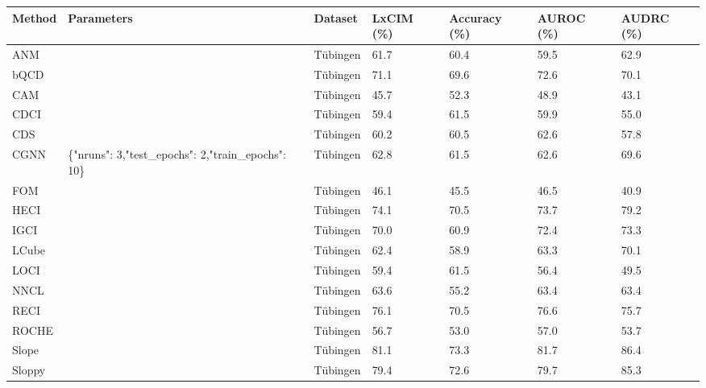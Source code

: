 \begin{tabular}{lllllll}
\toprule
Method & Parameters & Dataset & LxCIM (\%) & Accuracy (\%) & AUROC (\%) & AUDRC (\%) \\
\midrule
ANM &  & Tübingen & 61.7 & 60.4 & 59.5 & 62.9 \\
bQCD &  & Tübingen & 71.1 & 69.6 & 72.6 & 70.1 \\
CAM &  & Tübingen & 45.7 & 52.3 & 48.9 & 43.1 \\
CDCI &  & Tübingen & 59.4 & 61.5 & 59.9 & 55.0 \\
CDS &  & Tübingen & 60.2 & 60.5 & 62.6 & 57.8 \\
CGNN & \{"nruns": 3,"test\_epochs": 2,"train\_epochs": 10\} & Tübingen & 62.8 & 61.5 & 62.6 & 69.6 \\
FOM &  & Tübingen & 46.1 & 45.5 & 46.5 & 40.9 \\
HECI &  & Tübingen & 74.1 & 70.5 & 73.7 & 79.2 \\
IGCI &  & Tübingen & 70.0 & 60.9 & 72.4 & 73.3 \\
LCube &  & Tübingen & 62.4 & 58.9 & 63.3 & 70.1 \\
LOCI &  & Tübingen & 59.4 & 61.5 & 56.4 & 49.5 \\
NNCL &  & Tübingen & 63.6 & 55.2 & 63.4 & 63.4 \\
RECI &  & Tübingen & 76.1 & 70.5 & 76.6 & 75.7 \\
ROCHE &  & Tübingen & 56.7 & 53.0 & 57.0 & 53.7 \\
Slope &  & Tübingen & 81.1 & 73.3 & 81.7 & 86.4 \\
Sloppy &  & Tübingen & 79.4 & 72.6 & 79.7 & 85.3 \\
\bottomrule
\end{tabular}
